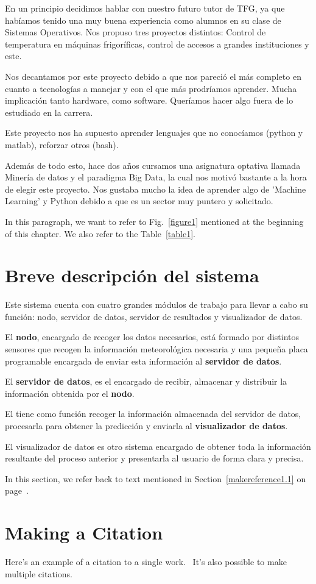 En un principio decidimos hablar con nuestro futuro tutor de TFG, ya que habíamos tenido una muy buena experiencia como alumnos en su clase de Sistemas Operativos.
Nos propuso tres proyectos distintos: Control de temperatura en máquinas frigoríficas, control de accesos a grandes instituciones y este.

Nos decantamos por este proyecto debido a que nos pareció el más completo en cuanto a tecnologías a manejar y con el que más prodríamos aprender. Mucha implicación tanto hardware, como software. Queríamos hacer algo fuera de lo estudiado en la carrera.

Este proyecto nos ha supuesto aprender lenguajes que no conocíamos (python y matlab), reforzar otros (bash).

Además de todo esto, hace dos años cursamos una asignatura optativa llamada Minería de datos y el paradigma Big Data, la cual nos motivó bastante a la hora de elegir este proyecto. Nos gustaba mucho la idea de aprender algo de 'Machine Learning' y Python debido a que es un sector muy puntero y solicitado.

In this paragraph, we want to refer to Fig.~\ref{figure1}
mentioned at the beginning of this chapter.  We also refer to the
Table~\ref{table1}.

\section{Breve descripción del sistema}
\label{makereference1.2}

Este sistema cuenta con cuatro grandes módulos de trabajo para llevar a cabo su función: nodo, servidor de datos, servidor de resultados y visualizador de datos.

El \textbf{nodo}, encargado de recoger los datos necesarios, está formado por distintos sensores que recogen la información meteorológica necesaria y una pequeña placa programable encargada de enviar esta información al \textbf{servidor de datos}.

El \textbf{servidor de datos}, es el encargado de recibir, almacenar y distribuir la información obtenida por el \textbf{nodo}. 

El  tiene como función recoger la información almacenada del servidor de datos, procesarla para obtener la predicción y enviarla al \textbf{visualizador de datos}.

El visualizador de datos es otro sistema encargado de obtener toda la información resultante del proceso anterior y presentarla al usuario de forma clara y precisa.

In this section, we refer back to text mentioned in
Section~\ref{makereference1.1} on page~\pageref{makereference1.1}.

\section{Making a Citation}
\label{makereference1.3}

Here's an example of a citation to a single
work.~\cite{CT:Weiner:1999} It's also possible to make multiple
citations.~\cite{CT:Phillips:1985, ARP:Loy:1974}
